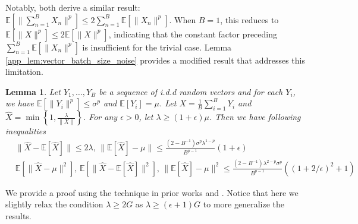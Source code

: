 \documentclass{article}
\newtheorem{lemma}{Lemma}
\def \E {\mathbb{E}}
\begin{document}
Notably, both \citep{kornilov_2023acceleratedzerothordermethodnonsmooth,hubler_2025gradientclippingnormalizationheavy} derive a similar result: $\mathbb{E}[\|\sum_{n=1}^B X_n\|^p]\leq 2\sum_{n=1}^B\mathbb{E}[\|X_n\|^p]$. 
When $B=1$, this reduces to $\mathbb{E}[\|X\|^p] \leq 2\mathbb{E}[\|X\|^p]$, indicating that the constant factor preceding $\sum_{n=1}^B\mathbb{E}[\|X_n\|^p]$ is insufficient for the trivial case. Lemma \ref{app_lem:vector_batch_size_noise} provides a modified result that addresses this limitation.

\begin{lemma}\label{app_lem:general_bias_clipped_rand_vec}
    Let $Y_1,\dots,Y_B$ be a sequence of i.d.d random vectors and for each $Y_i$, we have $\E[\|Y_i\|^p]\leq \sigma^p$ and $\E[Y_i]=\mu$. Let $X=\frac{1}{B}\sum_{i=1}^BY_i$ and $\hat{X}=\min\left\{1,\frac{\lambda}{\|X\|}\right\}$. For any $\epsilon>0$, let $\lambda\geq(1+\epsilon)\mu$. Then we have following inequalities 
    \begin{align}
        &\|\hat{X}-\E[\hat{X}]\|\leq 2\lambda,\,\|\E[\hat{X}]-\mu\|\leq \frac{(2-B^{-1})\sigma^p\lambda^{1-p}}{B^{p-1}}(1+\epsilon)\nonumber\\
        &\E[\|\hat{X}-\mu\|^2], \,\E[\|\hat{X}-\E[\hat{X}]\|^2],\,
        \|\E[\hat{X}]-\mu\|^2 \leq \frac{(2-B^{-1})\lambda^{2-p}\sigma^p}{B^{p-1}} \left(\left(1+2/\epsilon\right)^2+1\right)\nonumber
    \end{align}
\end{lemma}

We provide a proof using the technique in prior works \citep{liu_2023stochasticnonsmoothconvexoptimization} and \citep{sadiev2023highprobabilityboundsstochasticoptimization}. Notice that here we slightly relax the condition $\lambda \geq 2G$ as $\lambda\geq(\epsilon+1)G$ to more generalize the results.
\end{document}
